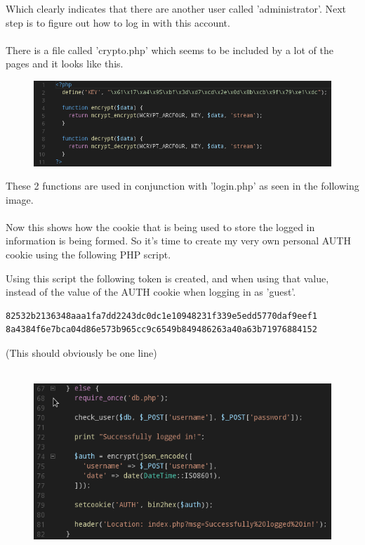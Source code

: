 \documentclass[writeup.tex]{subfiles}
\begin{document}
			Which clearly indicates that there are another user called 'administrator'. Next step is to figure out how to log in with this account.\\
			\\
			There is a file called 'crypto.php' which seems to be included by a lot of the pages and it looks like this.
			
			\begin{figure}[H]
				\centering
				\includegraphics[width=\linewidth]{"screenshots/pwns/Site 7 - crypto"}
			\end{figure}
			
			These 2 functions are used in conjunction with 'login.php' as seen in the following image.\\
			\\
			Now this shows how the cookie that is being used to store the logged in information is being formed. So it's time to create my very own personal AUTH cookie using the following PHP script.
			
			
		
			Using this script the following token is created, and when using that value, instead of the value of the AUTH cookie when logging in as 'guest'.
		
\begin{lstlisting}[backgroundcolor=\color{gray!25},basicstyle=\ttfamily]
82532b2136348aaa1fa7dd2243dc0dc1e10948231f339e5edd5770daf9eef1
8a4384f6e7bca04d86e573b965cc9c6549b849486263a40a63b71976884152
\end{lstlisting}
			(This should obviously be one line)\\
			\\
			\begin{figure}[H]
				\centering
				\includegraphics[width=\linewidth]{"screenshots/pwns/Site 7 - login"}
			\end{figure}
			
\end{document}

